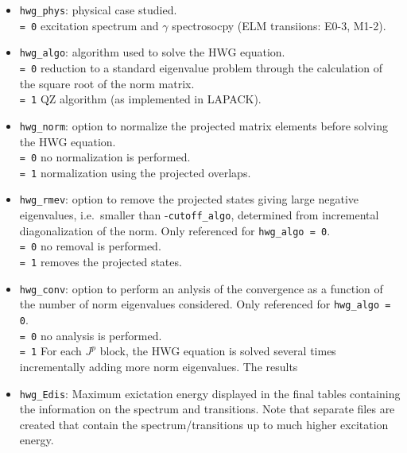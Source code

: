 \documentclass[a4paper,11pt]{article}
\newcommand{\ttt}[1]{\texttt{#1}}
\begin{document}
\begin{itemize}
\item \ttt{hwg\_phys}: physical case studied. \\[0.05cm]
 \ttt{= 0\:} excitation spectrum and $\gamma$ spectrosocpy (ELM transiions: E0-3, M1-2). 
\item \ttt{hwg\_algo}: algorithm used to solve the HWG equation. \\[0.05cm]
 \ttt{= 0\:} reduction to a standard eigenvalue problem through the calculation of the square root of the norm matrix. \\[0.05cm]
 \ttt{= 1\:} QZ algorithm (as implemented in LAPACK).
\item \ttt{hwg\_norm}: option to normalize the projected matrix elements before solving the HWG equation. \\[0.05cm]
 \ttt{= 0\:} no normalization is performed. \\[0.05cm]
 \ttt{= 1\:} normalization using the projected overlaps.
\item \ttt{hwg\_rmev}: option to remove the projected states giving large negative eigenvalues, i.e.\ smaller than -\ttt{cutoff\_algo}, determined from incremental
  diagonalization of the norm. Only referenced for \ttt{hwg\_algo = 0}. \\[0.05cm]
 \ttt{= 0\:} no removal is performed. \\[0.05cm]
 \ttt{= 1\:} removes the projected states.
\item \ttt{hwg\_conv}: option to perform an anlysis of the convergence as a function of the number of norm eigenvalues considered. Only referenced for \ttt{hwg\_algo = 0}. \\[0.05cm]
 \ttt{= 0\:} no analysis is performed. \\[0.05cm]
 \ttt{= 1\:} For each $J^p$ block, the HWG equation is solved several times incrementally adding more norm eigenvalues. The results
\item \ttt{hwg\_Edis}: Maximum exictation energy displayed in the final tables containing the information on the spectrum and transitions.
 Note that separate files are created that contain the spectrum/transitions up to much higher excitation energy. 
\end{itemize}
\end{document}
